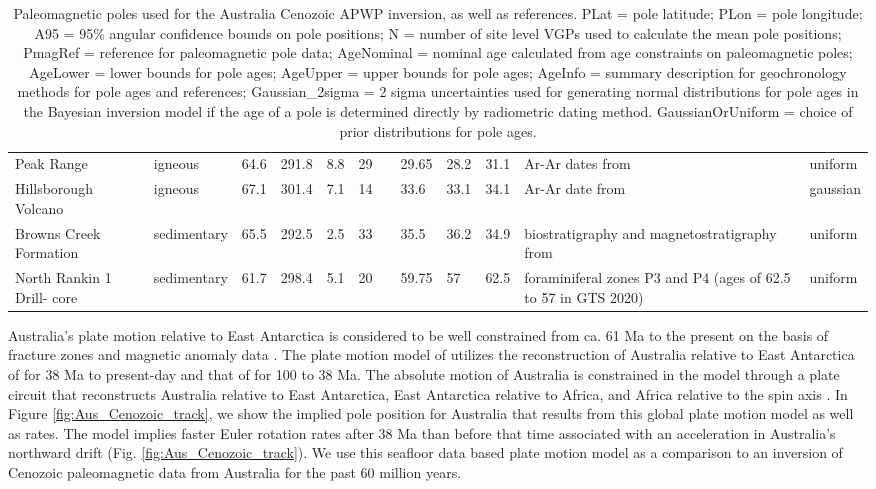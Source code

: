\documentclass[11pt,letterpaper]{article}
\begin{document}
\begin{table}
\begin{tabular}{p{2.5 cm}lllllp{2.5 cm}lllp{3 cm}l}
Peak Range                       & igneous     & 64.6 & 291.8 & 8.8 & 29  & \cite{Hansma2019a}                & 29.65      & 28.2     & 31.1     & Ar-Ar dates from \cite{Cohen2013a}                                           & uniform           \\
Hillsborough Volcano             & igneous     & 67.1 & 301.4 & 7.1 & 14  & \cite{Hansma2019a}                & 33.6       & 33.1     & 34.1     & Ar-Ar date from \cite{Cohen2013a}                                            & gaussian          \\
Browns Creek Formation           & sedimentary & 65.5 & 292.5 & 2.5 & 33  & \cite{Idnurm1994a}                & 35.5       & 36.2     & 34.9     & biostratigraphy and magnetostratigraphy from \cite{Shafik1997a}              & uniform           \\
North Rankin 1 Drill- core       & sedimentary & 61.7 & 298.4 & 5.1 & 20  & \cite{Idnurm1985a}                & 59.75      & 57       & 62.5     & foraminiferal zones P3 and P4 (ages of 62.5 to 57 in GTS 2020)               & uniform        
\end{tabular}
\label{tab:Aus_Cenozoic_poles}
\caption{Paleomagnetic poles used for the Australia Cenozoic APWP inversion, as well as references. PLat = pole latitude; PLon = pole longitude; A95 = 95\% angular confidence bounds on pole positions; N = number of site level VGPs used to calculate the mean pole positions; PmagRef = reference for paleomagnetic pole data; AgeNominal = nominal age calculated from age constraints on paleomagnetic poles; AgeLower = lower bounds for pole ages; AgeUpper = upper bounds for pole ages; AgeInfo = summary description for geochronology methods for pole ages and references;  Gaussian\_2sigma = 2 sigma uncertainties used for generating normal distributions for pole ages in the Bayesian inversion model if the age of a pole is determined directly by radiometric dating method. GaussianOrUniform = choice of prior distributions for pole ages.}
\end{table}

Australia's plate motion relative to East Antarctica is considered to be well constrained from ca. 61 Ma to the present on the basis of fracture zones and magnetic anomaly data \cite{Cande2004a}. The plate motion model of \cite{Muller2016a} utilizes the reconstruction of Australia relative to East Antarctica of \cite{Cande2004a} for 38 Ma to present-day and that of \cite{Whittaker2007a} for 100 to 38 Ma. The absolute motion of Australia is constrained in the model through a plate circuit that reconstructs Australia relative to East Antarctica, East Antarctica relative to Africa, and Africa relative to the spin axis \cite{Muller2016a}. In Figure \ref{fig:Aus_Cenozoic_track}, we show the implied pole position for Australia that results from this global plate motion model as well as rates. The model implies faster Euler rotation rates after 38 Ma than before that time associated with an acceleration in Australia's northward drift (Fig. \ref{fig:Aus_Cenozoic_track}). We use this seafloor data based plate motion model as a comparison to an inversion of Cenozoic paleomagnetic data from Australia for the past 60 million years.
\end{document}
